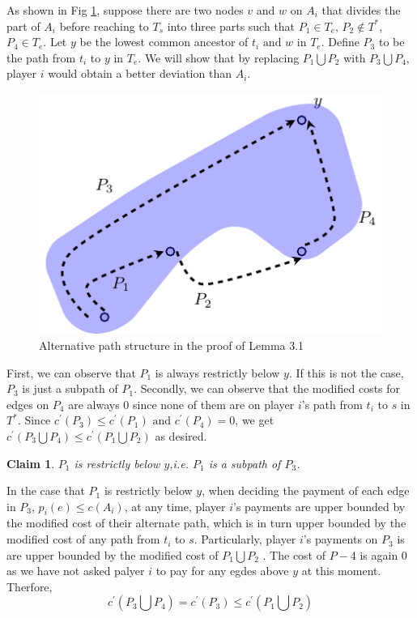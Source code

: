 \documentclass[11pt,psfig,times]{article}
\newtheorem{claim}{Claim}
\begin{document}
As shown in Fig \ref{fig:alterpath}, suppose there are two nodes \(v\) and \(w\) on \(A_i\) that divides the part of $A_i$ before reaching to $T_s$ into three parts such that \(P_1 \in T_e\), \(P_2 \notin T^*\), \(P_4 \in T_e\). Let $y$ be the lowest common ancestor of $t_i \text{ and } w \text{ in } T_e$. Define $P_3$ to be the path from $t_i$ to $y$ in $T_e$. We will show that by replacing $P_1 \bigcup P_2$ with $P_3 \bigcup P_4$, player $i$ would obtain a better deviation than $A_i$.
		\begin{figure}		
		\begin{center}
		\includegraphics{pictures/alterpath.pdf}
		\end{center}
		\caption{Alternative path structure in the proof of Lemma 3.1}
		\label{fig:alterpath}
	\end{figure}

First, we can observe that $P_1$ is always restrictly below $y$. If this is not the case, $P_3$ is just a subpath of $P_1$. Secondly, we can observe that the modified costs for edges on $P_4$ are always 0 since none of them are on player $i$'s path from $t_i$ to $s$ in $T^*$. Since $c^{'}(P_3) \leq c^{'}(P_1) \text{ and } c^{'}(P_4) = 0$, we get $ c^{'}(P_3\bigcup P_4) \leq c^{'}(P_1\bigcup P_2)$ as desired.  	
		\begin{claim}
		$P_1$ is restrictly below $y$,i.e. $P_1$ is a subpath of $P_3$. 
		\end{claim}

In the case that $P_1$ is restrictly below $y$,
when deciding the payment of each edge in $P_3$, $p_i(e) \leq c(A_i)$, at any time, player $i$'s payments are upper bounded by the modified cost of their alternate path, which is in turn upper bounded by the modified cost of any path from $t_i$ to $s$. Particularly, player $i$'s payments on $P_3$ is are upper bounded by the modified cost of $P_1\bigcup P_2$ . The cost of $P-4$ is again 0 as we have not asked palyer $i$ to pay for any egdes above $y$ at this moment. Therfore, 
 			 \[ c^{'}(P_3\bigcup P_4) = c^{'}(P_3) \leq c^{'}(P_1\bigcup P_2)\]
	
\end{document}
